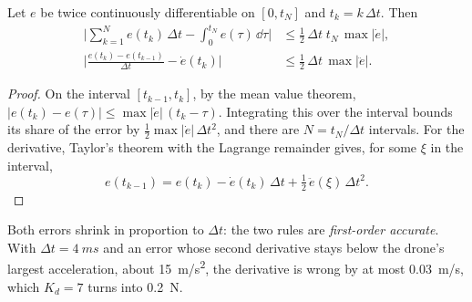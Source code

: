 \begin{theorem}
\label{thm:meet-discrete}
Let $e$ be twice continuously differentiable on $[0, t_N]$ and $t_k = k\,\Delta t$. Then
\begin{align*}
  \Big|\sum_{k=1}^{N} e(t_k)\,\Delta t - \int_0^{t_N} e(\tau)\,\dd\tau\Big| &\le \tfrac12\,\Delta t\;t_N\,\max|\dot e| , \\
  \Big|\frac{e(t_k) - e(t_{k-1})}{\Delta t} - \dot e(t_k)\Big| &\le \tfrac12\,\Delta t\,\max|\ddot e| .
\end{align*}
\end{theorem}
\begin{proof}
On the interval $[t_{k-1}, t_k]$, by the mean value theorem, $|e(t_k) - e(\tau)| \le \max|\dot e|\,(t_k - \tau)$. Integrating this over the interval bounds its share of the error by $\tfrac12\max|\dot e|\,\Delta t^2$, and there are $N = t_N/\Delta t$ intervals. For the derivative, Taylor's theorem with the Lagrange remainder gives, for some $\xi$ in the interval,
\begin{equation*}
  e(t_{k-1}) = e(t_k) - \dot e(t_k)\,\Delta t + \tfrac12\,\ddot e(\xi)\,\Delta t^2 .
\end{equation*}
\end{proof}

Both errors shrink in proportion to $\Delta t$: the two rules are \emph{first-order accurate}. With $\Delta t = \SI{4}{ms}$ and an error whose second derivative stays below the drone's largest acceleration, about \SI{15}{m/s^2}, the derivative is wrong by at most \SI{0.03}{m/s}, which $K_d = 7$ turns into \SI{0.2}{N}.


